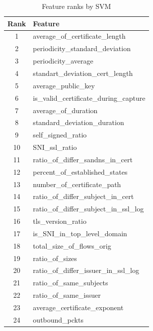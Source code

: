 \begin{table}[!htb]
	\caption{Feature ranks by SVM \label{tab:7}}
	\begin{center}
		\begin{tabular}{c|p{}}\hline\hline
			Rank & Feature  \\ \hline
			 1  & average\_of\_certificate\_length           \\
			 2  & periodicity\_standard\_deviation           \\
			 3  & periodicity\_average                       \\
			 4  & standart\_deviation\_cert\_length          \\
			 5  & average\_public\_key                       \\
			 6  & is\_valid\_certificate\_during\_capture    \\
			 7  & average\_of\_duration                      \\
			 8  & standard\_deviation\_duration              \\
			 9  & self\_signed\_ratio                        \\
			 10 & SNI\_ssl\_ratio                            \\
			 11 & ratio\_of\_differ\_sandns\_in\_cert        \\
			 12 & percent\_of\_established\_states           \\
			 13 & number\_of\_certificate\_path              \\
			 14 & ratio\_of\_differ\_subject\_in\_cert       \\
			 15 & ratio\_of\_differ\_subject\_in\_ssl\_log   \\
			 16 & tls\_version\_ratio                        \\
			 17 & is\_SNI\_in\_top\_level\_domain            \\
			 18 & total\_size\_of\_flows\_orig               \\
			 19 & ratio\_of\_sizes                           \\
			 20 & ratio\_of\_differ\_issuer\_in\_ssl\_log    \\
			 21 & ratio\_of\_same\_subjects                  \\
			 22 & ratio\_of\_same\_issuer                    \\
			 23 & average\_certificate\_exponent             \\
			 24 & outbound\_pckts                            \\

\end{tabular}
\end{center}
\end{table}
